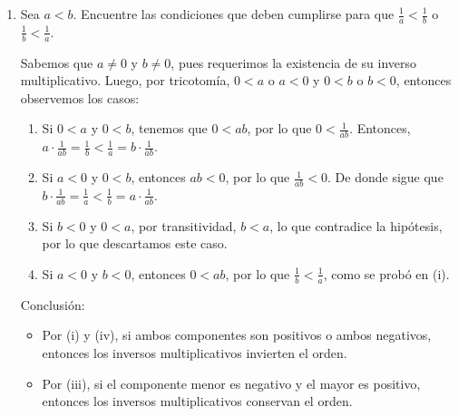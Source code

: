 \documentclass[11pt]{article}
\begin{document}
\begin{enumerate}[label=\alph*)]
    \item Sea $a<b$. Encuentre las condiciones que deben cumplirse para que $\frac{1}{a}<\frac{1}{b}$ o $\frac{1}{b}<\frac{1}{a}$.
    
    Sabemos que $a\neq 0$ y $b\neq 0$, pues requerimos la existencia de su inverso multiplicativo. Luego, por tricotomía, $0<a$ o $a<0$ y $0<b$ o $b<0$, entonces observemos los casos: \begin{enumerate}[label=\roman*)]
        \item Si $0<a$ y $0<b$, tenemos que $0<ab$, por lo que $0<\frac{1}{ab}$. Entonces, $a\cdot \frac{1}{ab} = \frac{1}{b} < \frac{1}{a} = b \cdot \frac{1}{ab}$.
        \item Si $a<0$ y $0<b$, entonces $ab<0$, por lo que $\frac{1}{ab}<0$. De donde sigue que $b \cdot \frac{1}{ab} = \frac{1}{a} < \frac{1}{b} = a\cdot \frac{1}{ab}$.
        \item Si $b<0$ y $0<a$, por transitividad, $b<a$, lo que contradice la hipótesis, por lo que descartamos este caso.
        \item Si $a<0$ y $b<0$, entonces $0<ab$, por lo que $\frac{1}{b} < \frac{1}{a}$, como se probó en (i).
    \end{enumerate}
    Conclusión: \begin{itemize}
        \item Por (i) y (iv), si ambos componentes son positivos o ambos negativos, entonces los inversos multiplicativos invierten el orden.
        \item Por (iii), si el componente menor es negativo y el mayor es positivo, entonces los inversos multiplicativos conservan el orden.
    \end{itemize}

\end{enumerate}
\end{document}
